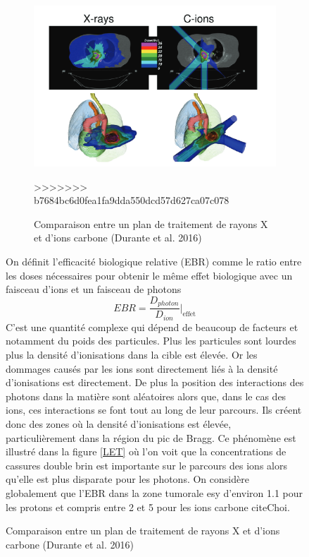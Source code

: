 \documentclass[11pt,a4paper,oldfontcommands]{memoir}
\begin{document}
\begin{figure}
\begin{figure}
    \centering
    \includegraphics[scale = 0.7]{intro/xrvshDuranteetal2016.png}
    \caption{Comparaison entre un plan de traitement de rayons X et d'ions carbone (Durante et al. 2016)}
>>>>>>> b7684bc6d0fea1fa9dda550dcd57d627ca07c078
    \label{CvsG}
\end{figure}

On définit l'efficacité biologique relative (EBR) comme le ratio entre les doses nécessaires pour obtenir le même effet biologique avec un faisceau d'ions et un faisceau de photons
$$EBR = \frac{D_{photon}}{D_{ion}}\bigg|_{\mathrm{effet}}$$
C'est une quantité complexe qui dépend de beaucoup de facteurs et notamment du poids des particules. Plus les particules sont lourdes plus la densité d'ionisations dans la cible est élevée. Or les dommages causés par les ions sont directement liés à la densité d'ionisations est directement. De plus la position des interactions des photons dans la matière sont aléatoires alors que, dans le cas des ions, ces interactions se font tout au long de leur parcours. Ils créent donc des zones où la densité d'ionisations est élevée, particulièrement dans la région du pic de Bragg. Ce phénomène est illustré dans la figure \ref{LET} où l'on voit que la concentrations de cassures double brin est importante sur le parcours des ions alors qu'elle est plus disparate pour les photons. On considère globalement que l'EBR dans la zone tumorale esy d'environ 1.1 pour les protons et compris entre 2 et 5 pour les ions carbone cite{Choi}. 


\end{figure}
\end{document}
